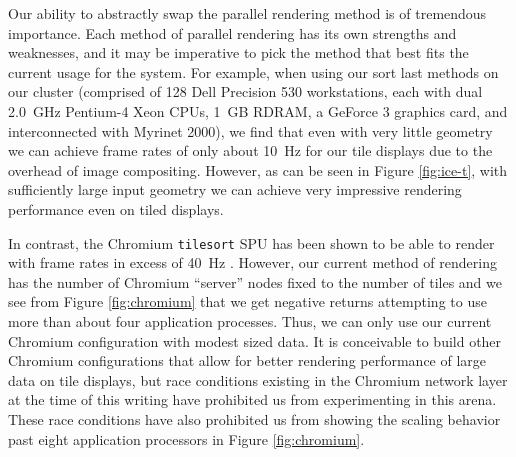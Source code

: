\documentclass[letterpaper]{acmsiggraph}
\newcommand{\sticky}[1]{}
\newcommand{\cidentifier}[1]{\texttt{#1}}
\begin{document}

  Our ability to abstractly swap the parallel rendering method is of
  tremendous importance.  Each method of parallel rendering has its own
  strengths and weaknesses, and it may be imperative to pick the method
  that best fits the current usage for the system.  For example, when using
  our sort last methods on our cluster (comprised of 128 Dell Precision 530
  workstations, each with dual 2.0~GHz Pentium-4 Xeon CPUs, 1~GB RDRAM, a
  GeForce 3 graphics card, and interconnected with Myrinet 2000), we find
  that even with very little geometry we can achieve frame rates of only
  about 10~Hz for our tile displays due to the overhead of image
  compositing.  However, as can be seen in Figure \ref{fig:ice-t}, with
  sufficiently large input geometry we can achieve very impressive
  rendering performance even on tiled displays.

  In contrast, the Chromium \cidentifier{tile\-sort} SPU has been shown to
  be able to render with frame rates in excess of 40~Hz \cite{Humphreys02}.
  However, our current method of rendering has the number of Chromium
  ``server'' nodes fixed to the number of tiles and we see from Figure
  \ref{fig:chromium} that we get negative returns attempting to use more
  than about four application processes.  Thus, we can only use our current
  Chromium configuration with modest sized data.  It is conceivable to
  build other Chromium configurations that allow for better rendering
  performance of large data on tile displays, but race conditions existing
  in the Chromium network layer at the time of this writing have prohibited
  us from experimenting in this arena.  These race conditions have also
  prohibited us from showing the scaling behavior past eight application
  processors in Figure \ref{fig:chromium}.

\end{document}
